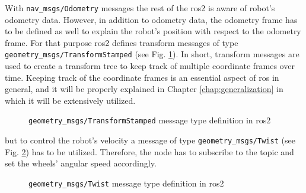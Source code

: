 With \texttt{nav\_msgs/Odometry} messages the rest of the \ac{ros2} is aware of robot's odometry data.
However, in addition to odometry data, the odometry frame has to be defined as well to explain the robot's position with respect to the odometry frame.
For that purpose \ac{ros2} defines transform messages of type \texttt{geometry\_msgs/TransformStamped} (see Fig. \ref{fig:simulation:transform}).
In short, transform messages are used to create a transform tree to keep track of multiple coordinate frames over time. 
Keeping track of the coordinate frames is an essential aspect of \ac{ros} in general, and it will be properly explained in Chapter \ref{chap:generalization} in which it will be extensively utilized.

\begin{figure}[H]
    \centering
    \begin{subfigure}[b]{0.9\textwidth}
    \end{subfigure}
    \caption{\texttt{geometry\_msgs/TransformStamped} message type definition in \ac{ros2}}
    \label{fig:simulation:transform}
\end{figure}

but to control the robot's velocity a message of type \texttt{geometry\_msgs/Twist} (see Fig. \ref{fig:simulation:twist}) has to be utilized.
Therefore, the node has to subscribe to the topic and set the wheels' angular speed accordingly.

\begin{figure}[H]
    \centering
    \begin{subfigure}[b]{0.9\textwidth}
    \end{subfigure}
    \caption{\texttt{geometry\_msgs/Twist} message type definition in \ac{ros2}}
    \label{fig:simulation:twist}
\end{figure}

